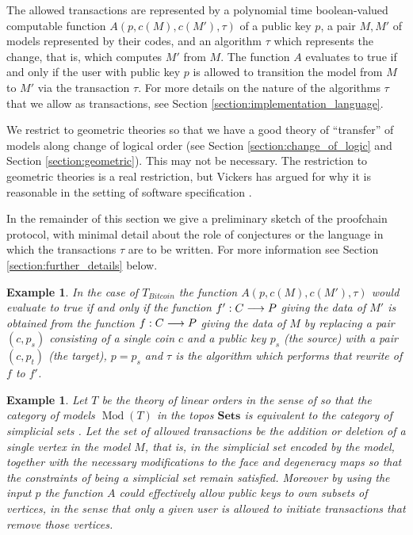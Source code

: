 \documentclass[english,letter paper,12pt,reqno]{article}
\theoremstyle{example}
\newtheorem{example}[theorem]{Example}
\begin{document}
The allowed transactions are represented by a polynomial time boolean-valued computable function $A(p,c(M),c(M'),\tau)$ of a public key $p$, a pair $M,M'$ of models represented by their codes, and an algorithm $\tau$ which represents the change, that is, which computes $M'$ from $M$. The function $A$ evaluates to true if and only if the user with public key $p$ is allowed to transition the model from $M$ to $M'$ via the transaction $\tau$. For more details on the nature of the algorithms $\tau$ that we allow as transactions, see Section \ref{section:implementation_language}.

We restrict to geometric theories \cite[\S X.3]{topos} so that we have a good theory of ``transfer'' of models along change of logical order (see Section \ref{section:change_of_logic} and Section \ref{section:geometric}). This may not be necessary. The restriction to geometric theories is a real restriction, but Vickers has argued for why it is reasonable in the setting of software specification \cite{vickers1,vickers2}.

In the remainder of this section we give a preliminary sketch of the proofchain protocol, with minimal detail about the role of conjectures or the language in which the transactions $\tau$ are to be written. For more information see Section \ref{section:further_details} below.

\begin{example} In the case of $T_{Bitcoin}$ the function $A(p,c(M),c(M'),\tau)$ would evaluate to true if and only if the function $f': C \longrightarrow P$ giving the data of $M'$ is obtained from the function $f: C \longrightarrow P$ giving the data of $M$ by replacing a pair $(c,p_s)$ consisting of a single coin $c$ and a public key $p_s$ (the source) with a pair $(c,p_t)$ (the target), $p = p_s$ and $\tau$ is the algorithm which performs that rewrite of $f$ to $f'$.
\end{example}

\begin{example} Let $T$ be the theory of linear orders in the sense of \cite[\S VIII.8]{topos} so that the category of models $\operatorname{Mod}(T)$ in the topos $\textbf{Sets}$ is equivalent to the category of simplicial sets \cite[Theorem VIII.5]{topos}. Let the set of allowed transactions be the addition or deletion of a single vertex in the model $M$, that is, in the simplicial set encoded by the model, together with the necessary modifications to the face and degeneracy maps so that the constraints of being a simplicial set remain satisfied. Moreover by using the input $p$ the function $A$ could effectively allow public keys to \emph{own} subsets of vertices, in the sense that only a given user is allowed to initiate transactions that remove those vertices.
\end{example}
\end{document}
